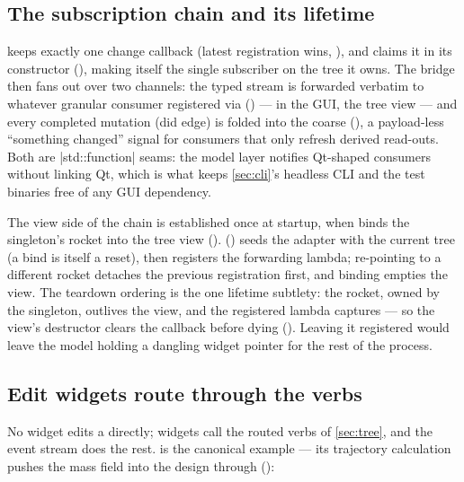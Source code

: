 \subsection{The subscription chain and its lifetime}\label{sec:gui-chain}

 keeps exactly one change callback (latest registration wins,
), and  claims it in its constructor
(), making itself the single subscriber on the tree it owns.
The bridge then fans out over two channels: the typed stream is forwarded verbatim to whatever
granular consumer registered via 
() --- in the GUI, the tree view --- and every completed
mutation (did edge) is folded into the coarse 
(), a payload-less ``something changed'' signal for consumers
that only refresh derived read-outs. Both are \cppinline|std::function| seams: the model layer
notifies Qt-shaped consumers without linking Qt, which is what keeps \cref{sec:cli}'s headless
CLI and the test binaries free of any GUI dependency.

The view side of the chain is established once at startup, when  binds the
 singleton's rocket into the tree view ().
 () seeds the adapter with
the current tree (a bind is itself a reset), then registers the forwarding lambda; re-pointing to
a different rocket detaches the previous registration first, and binding  empties
the view. The teardown ordering is the one lifetime subtlety: the rocket, owned by the
 singleton, outlives the view, and the registered lambda captures  ---
so the view's destructor clears the callback before dying
(). Leaving it registered would leave the model holding a
dangling widget pointer for the rest of the process.

\subsection{Edit widgets route through the verbs}\label{sec:gui-routed}

No widget edits a  directly; widgets call the routed verbs of \cref{sec:tree}, and the
event stream does the rest.  is the canonical example --- its trajectory
calculation pushes the mass field into the design through 
():

